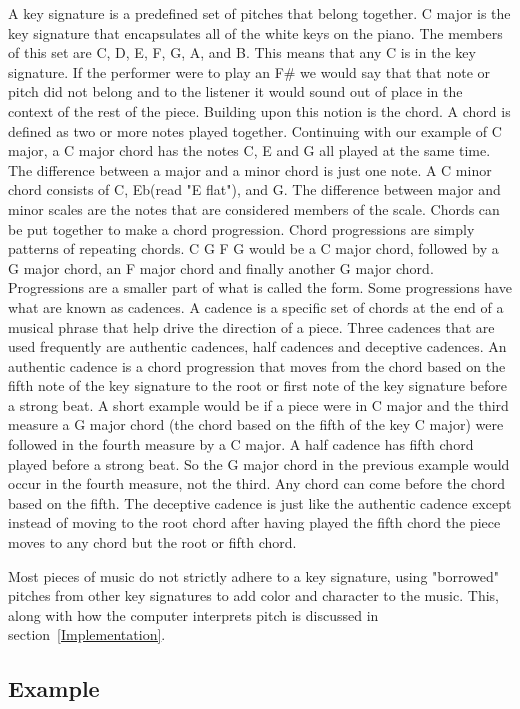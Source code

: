 \documentclass[12pt]{ucthesis}
\begin{document}
A key signature is a predefined set of pitches that belong together. C major is the key signature that encapsulates all of the white keys on the piano. The members of this set are C, D, E, F, G, A, and B. This means that any C is in the key signature. If the performer were to play an F\# we would say that that note or pitch did not belong and to the listener it would sound out of place in the context of the rest of the piece. Building upon this notion is the chord. A chord is defined as two or more notes played together. Continuing with our example of C major, a C major chord has the notes C, E and G all played at the same time. The difference between a major and a minor chord is just one note. A C minor chord consists of C, Eb(read "E flat"), and G. The difference between major and minor scales are the notes that are considered members of the scale. Chords can be put together to make a chord progression. Chord progressions are simply patterns of repeating chords. C G F G would be a C major chord, followed by a G major chord, an F major chord and finally another G major chord. Progressions are a smaller part of what is called the form. Some progressions have what are known as cadences. A cadence is a specific set of chords at the end of a musical phrase that help drive the direction of a piece. Three cadences that are used frequently are authentic cadences, half cadences and deceptive cadences. An authentic cadence is a chord progression that moves from the chord based on the fifth note of the key signature to the root or first note of the key signature before a strong beat. A short example would be if a piece were in C major and the third measure a G major chord (the chord based on the fifth of the key C major) were followed in the fourth measure by a C major. A half cadence has fifth chord played before a strong beat. So the G major chord in the previous example would occur in the fourth measure, not the third. Any chord can come before the chord based on the fifth. The deceptive cadence is just like the authentic cadence except instead of moving to the root chord after having played the fifth chord the piece moves to any chord but the root or fifth chord. 

Most pieces of music do not strictly adhere to a key signature, using "borrowed" pitches from other key signatures to add color and character to the music. This, along with how the computer interprets pitch is discussed in section~\ref{Implementation}.

\subsection{Example}
\end{document}
